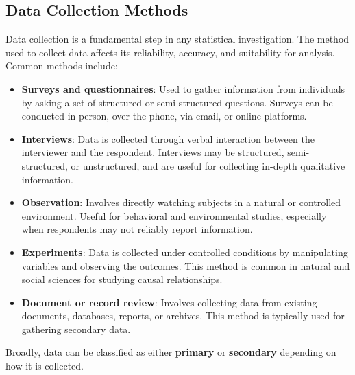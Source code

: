 \documentclass[twoside]{book}
\begin{document}
\subsection{Data Collection Methods}

 Data collection is a fundamental step in any statistical investigation. The method used to collect data affects its reliability, accuracy, and suitability for analysis. Common methods include:


\begin{itemize}
    \item \textbf{Surveys and questionnaires}: Used to gather information from individuals by asking a set of structured or semi-structured questions. Surveys can be conducted in person, over the phone, via email, or online platforms.

    \item \textbf{Interviews}: Data is collected through verbal interaction between the interviewer and the respondent. Interviews may be structured, semi-structured, or unstructured, and are useful for collecting in-depth qualitative information.

    \item \textbf{Observation}: Involves directly watching subjects in a natural or controlled environment. Useful for behavioral and environmental studies, especially when respondents may not reliably report information.

    \item \textbf{Experiments}: Data is collected under controlled conditions by manipulating variables and observing the outcomes. This method is common in natural and social sciences for studying causal relationships.

    \item \textbf{Document or record review}: Involves collecting data from existing documents, databases, reports, or archives. This method is typically used for gathering secondary data.
\end{itemize}

Broadly, data can be classified as either \textbf{primary} or \textbf{secondary} depending on how it is collected.
\end{document}
